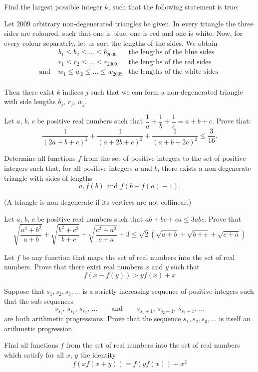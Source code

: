 \item[\textbf{A1.}]
Find the largest possible integer 
$k$, 
 such that the following statement is true:

Let 
$2009$
 arbitrary non-degenerated triangles be given. In every triangle the three sides are coloured, such that one is blue, one is red and one is white. Now, for every colour separately, let us sort the lengths of the sides. We obtain
\[ \left. \begin{array}{rcl}
 & b_1 \leq b_2\leq\ldots\leq b_{2009} & \textrm{the lengths of the blue sides }\\
 & r_1 \leq r_2\leq\ldots\leq r_{2009} & \textrm{the lengths of the red sides }\\
 \textrm{and } & w_1 \leq w_2\leq\ldots\leq w_{2009} & \textrm{the lengths of the white sides }\\
 \end{array}\right.\]


Then there exist 
$k$
 indices 
$j$
 such that we can form a non-degenerated triangle with side lengths 
$b_j$, 
$r_j$, 
$w_j$.

\item[\textbf{A2.}]
Let 
$a$, 
$b$, 
$c$
 be positive real numbers such that 
$\dfrac{1}{a} + \dfrac{1}{b} + \dfrac{1}{c} = a+b+c$.
 Prove that:
\[\frac{1}{(2a+b+c)^2}+\frac{1}{(a+2b+c)^2}+\frac{1}{(a+b+2c)^2}\leq \frac{3}{16}.\]

\item[\textbf{A3.}]
Determine all functions 
$ f$
 from the set of positive integers to the set of positive integers such that, for all positive integers 
$ a$
 and 
$ b$, 
 there exists a non-degenerate triangle with sides of lengths
\[ a, f(b) \text{ and } f(b + f(a) - 1).\]

(A triangle is non-degenerate if its vertices are not collinear.)

\item[\textbf{A4.}]
Let 
$a$, 
$b$, 
$c$
 be positive real numbers such that 
$ab+bc+ca\leq 3abc$.
 Prove that
\[\sqrt{\frac{a^2+b^2}{a+b}}+\sqrt{\frac{b^2+c^2}{b+c}}+\sqrt{\frac{c^2+a^2}{c+a}}+3\leq \sqrt{2}\left(\sqrt{a+b}+\sqrt{b+c}+\sqrt{c+a}\right)\]

\item[\textbf{A5.}]
Let 
$f$
 be any function that maps the set of real numbers into the set of real numbers. Prove that there exist real numbers 
$x$
 and 
$y$
 such that 
\[f\left(x-f(y)\right)>yf(x)+x\]

\item[\textbf{A6.}]
Suppose that 
$ s_1,s_2,s_3, \ldots$
 is a strictly increasing sequence of positive integers such that the sub-sequences 
\[s_{s_1},\, s_{s_2},\, s_{s_3},\, \ldots\qquad\text{and}\qquad s_{s_1+1},\, s_{s_2+1},\, s_{s_3+1},\, \ldots\]
 are both arithmetic progressions. Prove that the sequence 
$ s_1, s_2, s_3, \ldots$
 is itself an arithmetic progression.

\item[\textbf{A7.}]
Find all functions 
$f$
 from the set of real numbers into the set of real numbers which satisfy for all 
$x$, 
$y$
 the identity 
\[ f\left(xf(x+y)\right) = f\left(yf(x)\right) +x^2\]

